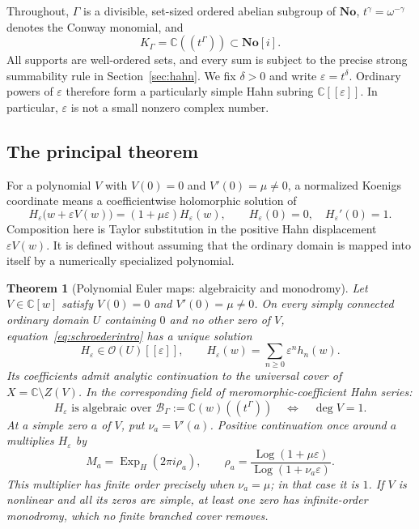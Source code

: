 \documentclass[11pt,a4paper]{article}
\numberwithin{equation}{section}
\newtheorem{theorem}{Theorem}[section]
\theoremstyle{definition}
\theoremstyle{remark}
\newcommand{\C}{\mathbb C}
\newcommand{\No}{\mathbf{No}}
\newcommand{\K}{K_\Gamma}
\newcommand{\B}{\mathscr B_\Gamma}
\newcommand{\eps}{\varepsilon}
\newcommand{\Hol}{\mathcal O}
\newcommand{\Log}{\operatorname{Log}}
\newcommand{\ExpH}{\operatorname{Exp}_{\!H}}
\begin{document}
Throughout, $\Gamma$ is a divisible, set-sized ordered abelian subgroup of
$\No$, $t^\gamma=\omega^{-\gamma}$ denotes the Conway monomial, and
\[
 \K=\C((t^\Gamma))\subset\No[i].
\]
All supports are well-ordered sets, and every sum is subject to the precise
strong summability rule in Section~\ref{sec:hahn}.  We fix $\delta>0$ and
write $\eps=t^\delta$.  Ordinary powers of $\eps$ therefore form a particularly
simple Hahn subring $\C[[\eps]]$.  In particular, $\eps$ is not a small
nonzero complex number.

\subsection{The principal theorem}

For a polynomial $V$ with $V(0)=0$ and $V'(0)=\mu\ne0$, a normalized
Koenigs coordinate means a coefficientwise holomorphic solution of
\begin{equation}\label{eq:schroederintro}
 H_\eps\bigl(w+\eps V(w)\bigr)
   =(1+\mu\eps)H_\eps(w),\qquad
 H_\eps(0)=0,\quad H_\eps'(0)=1.
\end{equation}
Composition here is Taylor substitution in the positive Hahn displacement
$\eps V(w)$.  It is defined without assuming that the ordinary domain is
mapped into itself by a numerically specialized polynomial.

\begin{theorem}[Polynomial Euler maps: algebraicity and monodromy]
\label{thm:main}
Let $V\in\C[w]$ satisfy $V(0)=0$ and $V'(0)=\mu\ne0$.
On every simply connected ordinary domain $U$ containing $0$ and no other
zero of $V$, equation~\eqref{eq:schroederintro} has a unique solution
\[
 H_\eps\in\Hol(U)[[\eps]],
 \qquad H_\eps(w)=\sum_{n\ge0}\eps^n h_n(w).
\]
Its coefficients admit analytic continuation to the universal cover of
$X=\C\setminus Z(V)$.  In the corresponding field of meromorphic-coefficient
Hahn series:
\begin{equation}\label{eq:dichotomyintro}
 H_\eps\text{ is algebraic over }\B:=\C(w)((t^\Gamma))
 \quad\Longleftrightarrow\quad \deg V=1.
\end{equation}
At a simple zero $a$ of $V$, put $\nu_a=V'(a)$.  Positive continuation once
around $a$ multiplies $H_\eps$ by
\begin{equation}\label{eq:monodromyintro}
 M_a=\ExpH(2\pi i\rho_a),\qquad
 \rho_a=\frac{\Log(1+\mu\eps)}{\Log(1+\nu_a\eps)}.
\end{equation}
This multiplier has finite order precisely when $\nu_a=\mu$; in that case it
is $1$.  If $V$ is nonlinear and all its zeros are simple, at least one zero
has infinite-order monodromy, which no finite branched cover removes.
\end{theorem}
\end{document}
